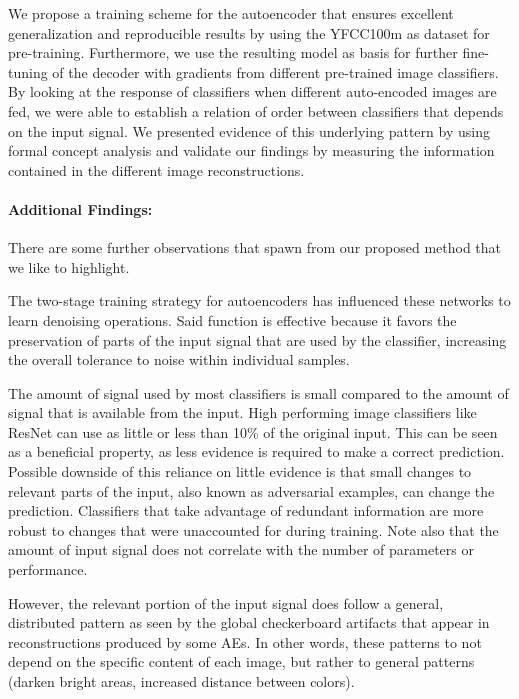 \documentclass[10pt,twocolumn,a4paper]{article}
\begin{document}
We propose a training scheme for the autoencoder that ensures excellent generalization and reproducible results by using the YFCC100m as dataset for pre-training.
Furthermore, we use the resulting model as basis for further fine-tuning of the decoder with gradients from different pre-trained image classifiers.
By looking at the response of classifiers when different auto-encoded images are fed, we were able to establish a relation of order between classifiers that depends on the input signal.
We presented evidence of this underlying pattern by using formal concept analysis and validate our findings by measuring the information contained in the different image reconstructions.

\vspace{-1.5em}\paragraph{Additional Findings:}
There are some further observations that spawn from our proposed method that we like to highlight.

The two-stage training strategy for autoencoders has influenced these networks to learn denoising operations.
Said function is effective because it favors the preservation of parts of the input signal that are used by the classifier, increasing the overall tolerance to noise within individual samples.

The amount of signal used by most classifiers is small compared to the amount of signal that is available from the input.
High performing image classifiers like ResNet can use as little or less than 10\% of the original input.
This can be seen as a beneficial property, as less evidence is required to make a correct prediction.
Possible downside of this reliance on little evidence is that small changes to relevant parts of the input, also known as adversarial examples, can change the prediction.
Classifiers that take advantage of redundant information are more robust to changes that were unaccounted for during training.
Note also that the amount of input signal does not correlate with the number of parameters or performance.

However, the relevant portion of the input signal does follow a general, distributed pattern as seen by the global checkerboard artifacts that appear in reconstructions produced by some AEs. In other words, these patterns to not depend on the specific content of each image, but rather to general patterns (\eg darken bright areas, increased distance between colors).
\end{document}
